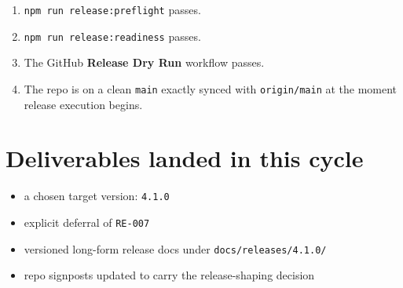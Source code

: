 \begin{enumerate}
  \begin{itemize}
  \tightlist
  \item
    preferred: expand the publish and dry-run matrices to include the new public i18n packages
  \item
    fallback: narrow the public \texttt{4\allowbreak{}.\allowbreak{}1\allowbreak{}.\allowbreak{}0} release promise explicitly and stop presenting those packages as released artifacts
  \end{itemize}
\item
  \texttt{n\allowbreak{}p\allowbreak{}m\allowbreak{} \allowbreak{}r\allowbreak{}u\allowbreak{}n\allowbreak{} \allowbreak{}r\allowbreak{}e\allowbreak{}l\allowbreak{}e\allowbreak{}a\allowbreak{}s\allowbreak{}e\allowbreak{}:\allowbreak{}p\allowbreak{}r\allowbreak{}e\allowbreak{}f\allowbreak{}l\allowbreak{}i\allowbreak{}g\allowbreak{}h\allowbreak{}t} passes.
\item
  \texttt{n\allowbreak{}p\allowbreak{}m\allowbreak{} \allowbreak{}r\allowbreak{}u\allowbreak{}n\allowbreak{} \allowbreak{}r\allowbreak{}e\allowbreak{}l\allowbreak{}e\allowbreak{}a\allowbreak{}s\allowbreak{}e\allowbreak{}:\allowbreak{}r\allowbreak{}e\allowbreak{}a\allowbreak{}d\allowbreak{}i\allowbreak{}n\allowbreak{}e\allowbreak{}s\allowbreak{}s} passes.
\item
  The GitHub \textbf{Release Dry Run} workflow passes.
\item
  The repo is on a clean \texttt{m\allowbreak{}a\allowbreak{}i\allowbreak{}n} exactly synced with \texttt{o\allowbreak{}r\allowbreak{}i\allowbreak{}g\allowbreak{}i\allowbreak{}n\allowbreak{}/\allowbreak{}m\allowbreak{}a\allowbreak{}i\allowbreak{}n} at the moment release execution begins.
\end{enumerate}

\section{Deliverables landed in this cycle}\label{record-202-deliverables-landed-in-this-cycle}

\begin{itemize}
\tightlist
\item
  a chosen target version: \texttt{4\allowbreak{}.\allowbreak{}1\allowbreak{}.\allowbreak{}0}
\item
  explicit deferral of \texttt{R\allowbreak{}E\allowbreak{}-\allowbreak{}0\allowbreak{}0\allowbreak{}7}
\item
  versioned long-form release docs under \texttt{d\allowbreak{}o\allowbreak{}c\allowbreak{}s\allowbreak{}/\allowbreak{}r\allowbreak{}e\allowbreak{}l\allowbreak{}e\allowbreak{}a\allowbreak{}s\allowbreak{}e\allowbreak{}s\allowbreak{}/\allowbreak{}4\allowbreak{}.\allowbreak{}1\allowbreak{}.\allowbreak{}0\allowbreak{}/}
\item
  repo signposts updated to carry the release-shaping decision
\end{itemize}

